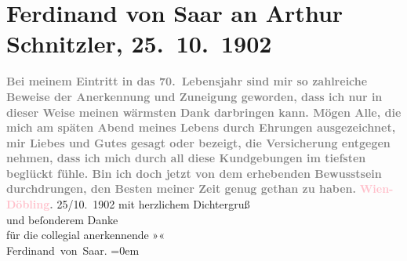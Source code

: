 

               \section[Ferdinand von Saar an Arthur Schnitzler, 25. 10. 1902]{ Ferdinand von Saar an Arthur Schnitzler, 25. 10. 1902}\nopagebreak{}\rehead{ }\normalsize\beginnumbering{} \toendnotes[C]{\smallbreak\pagebreak[2]} 
\toendnotes[C]{\smallbreak}\pstart
           \noindent{}\textcolor{gray}{\textbf{{\pb}Bei meinem Eintritt in das
                        70. Lebensjahr sind mir so zahlreiche Beweise der Anerkennung und Zuneigung
                        geworden, dass ich nur in dieser Weise meinen wärmsten Dank darbringen kann.
                        Mögen Alle, die mich am späten Abend meines Lebens durch Ehrungen
                        ausgezeichnet, mir Liebes und Gutes gesagt oder bezeigt, die Versicherung
                        entgegen nehmen, dass ich mich durch all diese Kundgebungen im tiefsten
                        beglückt fühle. Bin ich doch jetzt von dem erhebenden Bewusstsein
                        durchdrungen, den Besten meiner Zeit genug gethan zu haben.}}\pend
           \pstart
           \textcolor{gray}{\textbf{\textcolor{pink}{Wien-Döbling}{}\ledrightnote{\textcolor{pink}{XIX., Döbling}}.}}{ }25/10. 1902\pend
           \pstart
           mit herzlichem Dichtergruß{\\[\baselineskip]}und beſonderem Danke{\\[\baselineskip]}für die collegial
                    anerkennende »\label{K_L01245_1v}\label{K_L01245_1h}«{\\[\baselineskip]}\spacefill\mbox{Ferdinand von Saar.}\pend
           \leftskip=0em{}\endnumbering{}  
      